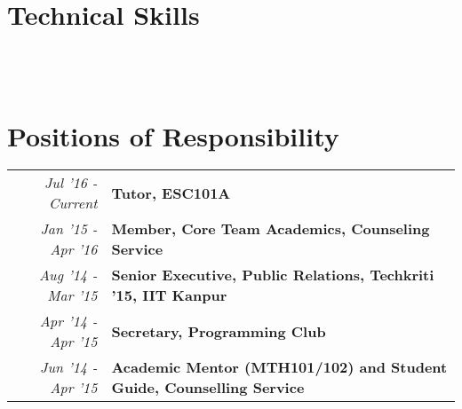 \documentclass[a4paper]{norm-resume}
\begin{document}
 	

\vspace{0.5mm}


\section{Technical Skills \hrulefill}

\vspace{0.5mm}	%

 \hfill {} \\
\vspace{0mm}	%
 \hfill {} \\
\vspace{0mm}	%
 \hfill {}

\vspace{-0.5mm}	%


\section{Positions of Responsibility \hrulefill}

\vspace{0mm} %
		
	\begin{tabular}{r|p{16cm}}	

	\null \hspace{10mm} \emph{Jul '16 - Current} & \textbf{Tutor, ESC101A}\\
	
	\emph{Jan '15 - Apr '16} & \textbf{Member, Core Team Academics, Counseling Service}\\

	\emph{Aug '14 - Mar '15} & \textbf{Senior Executive, Public Relations, Techkriti '15, IIT Kanpur}\\

	\emph{Apr '14 - Apr '15} & \textbf{Secretary, Programming Club}\\

	\emph{Jun '14 - Apr '15} & \textbf{Academic Mentor (MTH101/102) and Student Guide, Counselling Service}\\ 

	\end{tabular}
\end{document}
